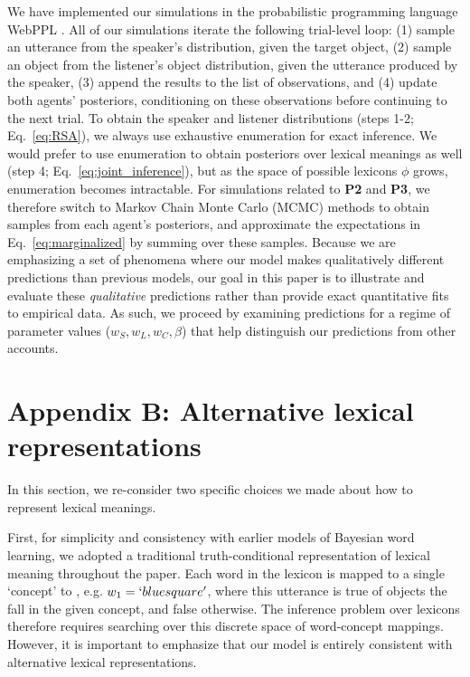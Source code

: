 \documentclass[10pt, jou, floatsintext]{apa7}
\begin{document}
We have implemented our simulations in the probabilistic programming language WebPPL \cite{GoodmanStuhlmuller14_DIPPL}.
All of our simulations iterate the following trial-level loop: (1) sample an utterance from the speaker's distribution, given the target object, (2) sample an object from the listener's object distribution, given the utterance produced by the speaker, (3) append the results to the list of observations, and (4) update both agents' posteriors, conditioning on these observations before continuing to the next trial.
To obtain the speaker and listener distributions (steps 1-2; Eq.~\ref{eq:RSA}), we always use exhaustive enumeration for exact inference.
We would prefer to use enumeration to obtain posteriors over lexical meanings as well (step 4; Eq.~\ref{eq:joint_inference}), but as the space of possible lexicons $\phi$ grows, enumeration becomes intractable.
For simulations related to \textbf{P2} and \textbf{P3}, we therefore switch to Markov Chain Monte Carlo (MCMC) methods to obtain samples from each agent's posteriors, and approximate the expectations in Eq.~\ref{eq:marginalized} by summing over these samples. 
Because we are emphasizing a set of phenomena where our model makes qualitatively different predictions than previous models, our goal in this paper is to illustrate and evaluate these \emph{qualitative} predictions rather than provide exact quantitative fits to empirical data.
As such, we proceed by examining predictions for a regime of parameter values ($w_S, w_L, w_C,\beta$) that help distinguish our predictions from other accounts.

\section{Appendix B: Alternative lexical representations}

In this section, we re-consider two specific choices we made about how to represent lexical meanings.

First, for simplicity and consistency with earlier models of Bayesian word learning, we adopted a traditional truth-conditional representation of lexical meaning throughout the paper. 
Each word in the lexicon is mapped to a single `concept' to , e.g. $w_1 = `blue square'$, where this utterance is true of objects the fall in the given concept, and false otherwise. 
The inference problem over lexicons therefore requires searching over this discrete space of word-concept mappings. 
However, it is important to emphasize that our model is entirely consistent with alternative lexical representations.
\end{document}
